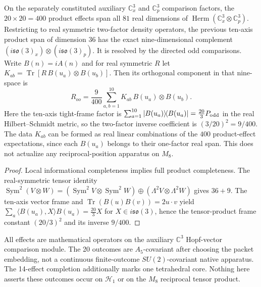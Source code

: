 \documentclass[12pt,a4paper]{article}
\begin{document}
\begin{proposition}
\label{p2c:prop:cc12-reciprocal-blind-nine-completion}
On the separately constituted auxiliary $\mathbb C^3_x$ and
$\mathbb C^3_p$ comparison factors, the $20\times20=400$ product
effects span all $81$ real dimensions of
$\operatorname{Herm}(\mathbb C^3_x\otimes\mathbb C^3_p)$.
Restricting to real symmetric two-factor density operators, the
previous ten-axis product span of dimension $36$ has the exact
nine-dimensional complement
$(i\mathfrak{so}(3)_x)\otimes(i\mathfrak{so}(3)_p)$.
It is resolved by the directed odd comparisons. Write
$B(n)=iA(n)$ and for real symmetric $R$ let
$K_{ab}=\operatorname{Tr}[R\,B(u_a)\otimes B(u_b)]$.
Then its orthogonal component in that nine-space is
\[
 \boxed{R_{oo}=\frac9{400}\sum_{a,b=1}^{10}
  K_{ab}\,B(u_a)\otimes B(u_b).}
\]
Here the ten-axis tight-frame factor is
$\sum_{a=1}^{10}|B(u_a)\rangle\!\langle B(u_a)|
 =\tfrac{20}{3}P_{\rm odd}$ in the real Hilbert--Schmidt
metric, so the two-factor inverse coefficient is $(3/20)^2=9/400$.
The data $K_{ab}$ can be formed as real linear combinations
of the $400$ product-effect expectations, since each $B(u_a)$ belongs
to their one-factor real span. This does not actualize any
reciprocal-position apparatus on $M_8$.
\end{proposition}
\begin{proof}
Local informational completeness implies full product completeness.
The real-symmetric tensor identity
$\operatorname{Sym}^2(V\otimes W)=
(\operatorname{Sym}^2V\otimes\operatorname{Sym}^2W)
\oplus(\Lambda^2V\otimes\Lambda^2W)$
gives $36+9$. The ten-axis vector frame and
$\operatorname{Tr}(B(u)B(v))=2u\cdot v$ yield
$\sum_a\langle B(u_a),X\rangle B(u_a)=\tfrac{20}{3}X$
for $X\in i\mathfrak{so}(3)$, hence the tensor-product frame
constant $(20/3)^2$ and its inverse $9/400$.
\end{proof}

\begin{remark}
\label{p2c:rem:cc12-readout-occurrence-firewall}
All effects are mathematical operators on the auxiliary
$\mathbb C^3$ Hopf-vector comparison module. The 20 outcomes are
$A_5$-covariant after choosing the packet embedding, not a
continuous finite-outcome $SU(2)$-covariant native apparatus.
The 14-effect completion additionally marks one tetrahedral core.
Nothing here asserts these outcomes occur on $\mathcal H_1$ or on
the $M_8$ reciprocal tensor product.
\end{remark}
\end{document}
